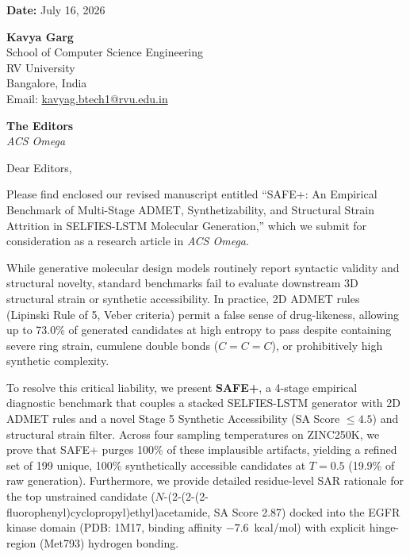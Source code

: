 \documentclass[11pt]{article}
\begin{document}
\thispagestyle{empty}

\hfill \textbf{Date:} July 16, 2026

\begin{flushleft}
\textbf{Kavya Garg} \\
School of Computer Science Engineering \\
RV University \\
Bangalore, India \\
Email: \href{mailto:kavyag.btech1@rvu.edu.in}{kavyag.btech1@rvu.edu.in}
\end{flushleft}

\vspace{1em}

\begin{flushleft}
\textbf{The Editors} \\
\textit{ACS Omega}
\end{flushleft}

\vspace{1em}

Dear Editors,

Please find enclosed our revised manuscript entitled ``SAFE+: An Empirical Benchmark of Multi-Stage ADMET, Synthetizability, and Structural Strain Attrition in SELFIES-LSTM Molecular Generation,'' which we submit for consideration as a research article in \textit{ACS Omega}.

While generative molecular design models routinely report syntactic validity and structural novelty, standard benchmarks fail to evaluate downstream 3D structural strain or synthetic accessibility. In practice, 2D ADMET rules (Lipinski Rule of 5, Veber criteria) permit a false sense of drug-likeness, allowing up to 73.0\% of generated candidates at high entropy to pass despite containing severe ring strain, cumulene double bonds ($C{=}C{=}C$), or prohibitively high synthetic complexity.

To resolve this critical liability, we present \textbf{SAFE+}, a 4-stage empirical diagnostic benchmark that couples a stacked SELFIES-LSTM generator with 2D ADMET rules and a novel Stage 5 Synthetic Accessibility (SA Score $\le 4.5$) and structural strain filter. Across four sampling temperatures on ZINC250K, we prove that SAFE+ purges 100\% of these implausible artifacts, yielding a refined set of 199 unique, 100\% synthetically accessible candidates at $T{=}0.5$ (19.9\% of raw generation). Furthermore, we provide detailed residue-level SAR rationale for the top unstrained candidate ($N$-(2-(2-(2-fluorophenyl)cyclopropyl)ethyl)acetamide, SA Score 2.87) docked into the EGFR kinase domain (PDB: 1M17, binding affinity $-7.6$~kcal/mol) with explicit hinge-region (Met793) hydrogen bonding.
\end{document}
